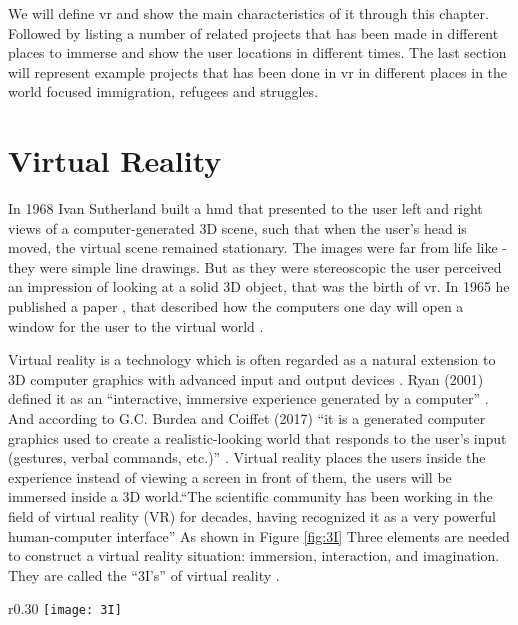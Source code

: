 We will define \acrfull{vr} and show the main characteristics of it through this chapter. Followed by listing a number of related projects that has been made in different places to immerse and show the user locations in different times. The last section will represent example projects that has been done in \acrshort{vr} in different places in the world focused immigration, refugees and struggles.   

\section{Virtual Reality}
In 1968 Ivan Sutherland built a \acrlong{hmd} that presented to the user left and right views of a
computer-generated 3D scene, such that when the user's head is moved, the virtual
scene remained stationary. The images were far from life like - they were simple line
drawings. But as they were stereoscopic the user perceived an impression of looking
at a solid 3D object, that was the birth of \acrlong{vr}. In 1965 he published a paper , that described how the computers one day will open a window for the user to the virtual world \citep{Vince2011}.  

Virtual reality is a technology which is often regarded as a natural extension to 3D computer graphics with advanced input and output devices \citep{Jayaram1997}. Ryan (2001) defined it as an “interactive, immersive experience generated by a computer” \citep{Ryan2001}. And according to G.C. Burdea and Coiffet (2017) “it is a generated computer graphics used to create a realistic-looking world that responds to the user’s input (gestures, verbal commands, etc.)” \cite[p.20]{burdea2017virtual}. Virtual reality places the users inside the experience instead of viewing a screen in front of them, the users will be immersed inside a 3D world.“The scientific community has been working in the field of virtual reality (VR) for decades, having recognized it as a very powerful human-computer interface”\cite[p.19]{burdea2017virtual} As shown in Figure \ref{fig:3I} Three elements are needed to construct a virtual reality situation: immersion, interaction, and imagination. They are called the “3I’s” of virtual reality \citep{Hu2016,burdea2017virtual}.

\begin{wrapfigure}{r}{0.30\textwidth} %
    \centering
    \texttt{[image: 3I]}
    \caption{The 3I's of Virtual Reality - © 2003 by John Wiley \& Sons Inc. All rights
reserved}
    \label{fig:3I}
\end{wrapfigure}




